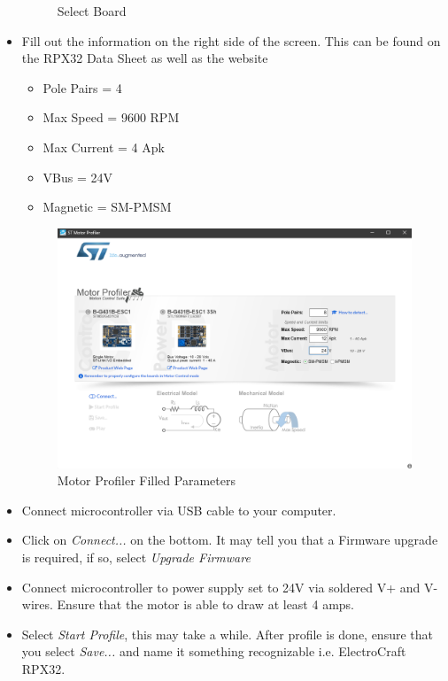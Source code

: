 \documentclass[10pt]{article}
\begin{document}
\begin{itemize}
\begin{figure}[H]
                        \caption{Select Board}
                    \end{figure}
                \item Fill out the information on the right side of the screen. This can be found on the RPX32 Data Sheet as well as the website
                    \begin{itemize}
                        \item Pole Pairs = 4
                        \item Max Speed = 9600 RPM
                        \item Max Current = 4 Apk
                        \item VBus = 24V
                        \item Magnetic = SM-PMSM
                    \end{itemize}
                    \begin{figure}[H]
                        \centerline{\includegraphics[width=\textwidth]{References/Motor Profiler Parameters.png}}
                        \caption{Motor Profiler Filled Parameters}
                    \end{figure}
                \item Connect microcontroller via USB cable to your computer.
                \item Click on \emph{Connect...} on the bottom. It may tell you that a Firmware upgrade is required, if so, select \emph{Upgrade Firmware}
                \item Connect microcontroller to power supply set to 24V via soldered V+ and V- wires. Ensure that the motor is able to draw at least 4 amps.
                \item Select \emph{Start Profile}, this may take a while. After profile is done, ensure that you select \emph{Save...} and name it something recognizable i.e. ElectroCraft RPX32.
            \end{itemize}
\end{document}
